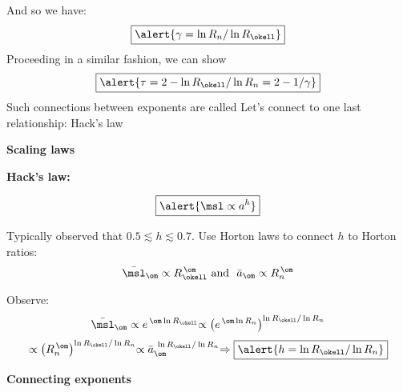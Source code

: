 \begin{frame}[label=]
\begin{frame}[label=]
\begin{frame}[label=]
\begin{frame}[label=]
\begin{frame}[label=]
\begin{frame}[label=]
\begin{frame}[label=]
\begin{frame}[label=]
\begin{frame}[label=]
\begin{frame}[label=]
\begin{frame}[label=]
\begin{frame}[label=]
\begin{frame}[label=]
\begin{frame}[label=]
\begin{frame}[label=]
\begin{frame}[label=]
\begin{frame}[label=]
\begin{frame}[label=]
\begin{frame}[label=]
\begin{frame}[label=]
\begin{frame}[label=]
\begin{frame}[label=]
\begin{frame}[label=]
\begin{frame}[label=]
\begin{frame}[label=]
\begin{frame}[label=]
\begin{frame}[label=]
\begin{frame}[label=]
\begin{frame}[label=]
\begin{frame}[label=]
\begin{frame}[label=]
\begin{frame}[label=]
\begin{frame}[label=]
     And so we have:
      $$
      \boxed{\alert{\gamma = \ln R_n / \ln R_\okell}}
      $$
     Proceeding in a similar fashion, we can
      show 
      $$
      \boxed{\alert{\tau = 2 - \ln R_\okell / \ln R_n = 2 - 1/\gamma}}
      $$
     Such connections between exponents are 
      called 
     Let's connect to one last relationship: Hack's law
    
    
  


\begin{frame}[label=]
  \textbf{Scaling laws}

  \textbf{Hack's law:\cite{hack1957a}}
    
     
      $$
      \boxed{\alert{
          \msl \propto a^{h}
        }}
      $$
    
      Typically observed that $0.5 \lesssim h \lesssim 0.7$.
     Use Horton laws to connect $h$ to Horton ratios:
      $$
      \bar{\msl}_\om \propto R_\okell^{\, \om}
      \mbox{\ and \ }
      \bar{a}_\om \propto R_n^{\, \om}
      $$
    
      Observe:
      $$
      \bar{\msl}_{\om} \propto e^{\, \om \ln R_\okell}
      {
        \propto \left(e^{\, \om \ln R_n} \right)^{ \ln R_\okell / \ln R_n}
      }
      $$
      $$
      {
        \propto 
        \left(
          R_n^{\, \om }
        \right)^{\ln R_\okell / \ln R_n}
      }
      {
        \propto
        \bar{a}_\om^{\ \ln R_\okell / \ln R_n}
      }
      {
        \Rightarrow \boxed{\alert{ h = \ln R_\okell / \ln R_n}}
      }
      $$
    
  



\begin{frame}[label=]
  \textbf{Connecting exponents}
  

\end{frame}
\end{frame}
\end{frame}
\end{frame}
\end{frame}
\end{frame}
\end{frame}
\end{frame}
\end{frame}
\end{frame}
\end{frame}
\end{frame}
\end{frame}
\end{frame}
\end{frame}
\end{frame}
\end{frame}
\end{frame}
\end{frame}
\end{frame}
\end{frame}
\end{frame}
\end{frame}
\end{frame}
\end{frame}
\end{frame}
\end{frame}
\end{frame}
\end{frame}
\end{frame}
\end{frame}
\end{frame}
\end{frame}
\end{frame}
\end{frame}
